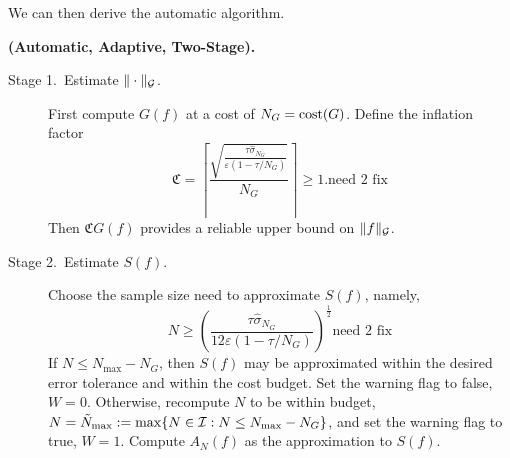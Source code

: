 \documentclass[12pt]{article}
\begin{document}
We can then derive the automatic algorithm.
\begin{algo} \label{twostagedetalgo} {\bf (Automatic, Adaptive, Two-Stage).} 

\begin{description}

\item[Stage 1.\ Estimate {$\|\cdot\|_{\mathcal{G}}$}.] First compute $G(f)$ at a cost of $N_{G} = \text{cost}(G)$.   Define the inflation factor
\begin{equation}\label{norminflate}
\mathfrak{C} =\left\lceil\frac{\sqrt{\frac{\tau \hat{\sigma}_{N_G}}{\varepsilon(1 - \tau/ N_G)}}}{N_{G}}\right\rceil \ge 1. \text{need 2 fix}
\end{equation}
Then $\mathfrak{C} G(f)$ provides a reliable upper bound on $\|f\|_{\mathcal{G}}$.

\item [Stage 2.\ Estimate {$S(f)$}.] Choose the sample size need to approximate $S(f)$, namely,
\[
N \geq \left(\frac{\tau \hat{\sigma}_{N_G}}{12\varepsilon(1-\tau/N_G)}\right)^{\frac{1}{2}} \text{need 2 fix}
\]
If $N \le N_{\max}-N_G$, then $S(f)$ may be approximated within the desired error tolerance and within the cost budget.  Set the warning flag to false, $W=0$. Otherwise, recompute $N$ to be within budget, $N = \tilde{N}_{\max} := \max\{N \in \mathcal{I} : N\le N_{\max} -  N_G\}$, and set the warning flag to true, $W=1$.  Compute $A_N(f)$ as the approximation to $S(f)$.
\end{description}

%
%
\end{algo}
\end{document}
